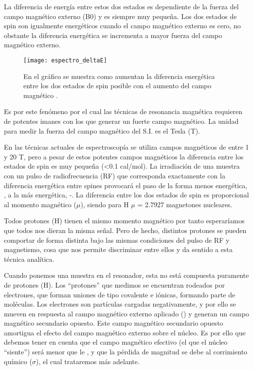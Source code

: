 La diferencia de energía entre estos dos estados es dependiente de la fuerza del campo magnético externo (B0) y es siempre muy pequeña. Los dos estados de spin son igualmente energéticos cuando el campo magnético externo es cero, no obstante la diferencia energética se incrementa a mayor fuerza del campo magnético externo.

\begin{figure}[htb]
 \begin{figg}
   \texttt{[image: espectro\_deltaE]}
   \caption{En el gráfico se muestra como aumentan la diferencia energética entre los dos estados de spin posible con el aumento del campo magnético \Bzero.}
 \label{fig:espectro_deltaE}
 \end{figg}
\end{figure}
 


Es por este fenómeno por el cual las técnicas de resonancia magnética requieren de potentes imanes con los que generar un fuerte campo magnético. La unidad para medir la fuerza del campo magnético del S.I. es el Tesla (T). 

En las técnicas actuales de espectroscopía se utiliza campos magnéticos de entre 1 y 20 T, pero a pesar de estos potentes campos magnéticos la diferencia entre los estados de spin es muy pequeña  (<0.1 cal/mol). 
La irradiación de una muestra con un pulso de radiofrecuencia (RF) que corresponda exactamente con la diferencia energética entre spines provocará el paso de la forma menos energética, , a la más energética, -. La diferencia entre los dos estados de spin es proporcional al momento magnético ($\mu$), siendo para H $\mu$ = 2.7927 magnetones nucleares.

Todos protones (H) tienen el  mismo momento magnético por tanto esperaríamos que todos nos dieran la misma señal. Pero de hecho, distintos protones se pueden comportar de forma distinta bajo las mismas condiciones del pulso de RF y magnetismo, cosa que nos permite discriminar entre ellos y da sentido a esta técnica analítica.

Cuando ponemos una muestra en el resonador, esta no está compuesta puramente de protones (H). Los ``protones'' que medimos se encuentran rodeados por electrones, que forman uniones de tipo covalente e iónicas, formando parte de moléculas. Los electrones son partículas cargadas negativamente, y por ello se mueven en respuesta al campo magnético externo aplicado (\Bzero) y generan un campo magnético secundario opuesto. Este campo magnético secundario opuesto amortigua el efecto del campo magnético externo sobre el núcleo. Es por ello que debemos tener en cuenta que el campo magnético efectivo (el que el núcleo ``siente'') será menor que le \Bzero, y que la pérdida de magnitud se debe al corrimiento químico ($\sigma$), el cual trataremos más adelante. 

